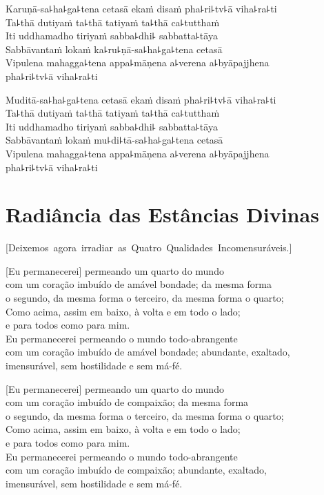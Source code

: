 Karuṇā-sa꜕ha꜕ga꜕tena cetasā ekaṁ disaṁ pha꜕ri꜕tv꜕ā viha꜕ra꜕ti\\
Ta꜕thā dutiyaṁ ta꜕thā tatiyaṁ ta꜕thā ca꜕tutthaṁ\\
Iti uddhamadho tiriyaṁ sabba꜕dhi꜕ sabbatta꜕tāya\\
Sabbāvantaṁ lokaṁ ka꜕ru꜕ṇā-sa꜕ha꜕ga꜕tena cetasā\\
Vipulena mahagga꜕tena appa꜕māṇena a꜕verena a꜕byāpajjhena\\
\vin pha꜕ri꜕tv꜕ā viha꜕ra꜕ti

Muditā-sa꜕ha꜕ga꜕tena cetasā ekaṁ disaṁ pha꜕ri꜕tv꜕ā viha꜕ra꜕ti\\
Ta꜕thā dutiyaṁ ta꜕thā tatiyaṁ ta꜕thā ca꜕tutthaṁ\\
Iti uddhamadho tiriyaṁ sabba꜕dhi꜕ sabbatta꜕tāya\\
Sabbāvantaṁ lokaṁ mu꜕di꜕tā-sa꜕ha꜕ga꜕tena cetasā\\
Vipulena mahagga꜕tena appa꜕māṇena a꜕verena a꜕byāpajjhena\\
\vin pha꜕ri꜕tv꜕ā viha꜕ra꜕ti

\chapter[Radiância das Estâncias Divinas]{Radiância das Estâncias Divinas}

\enlargethispage{\baselineskip}


\begin{leader}
  \vspace*{-\baselineskip}
  \mbox{[Deixemos agora irradiar as Quatro Qualidades Incomensuráveis.]}
\end{leader}

[Eu permanecerei] permeando um quarto do mundo\\
\vin com um coração imbuído de amável bondade; da mesma forma\\
\vin o segundo, da mesma forma o terceiro, da mesma forma o quarto;\\
Como acima, assim em baixo, à volta e em todo o lado;\\
\vin e para todos como para mim.\\
Eu permanecerei permeando o mundo todo-abrangente\\
\vin com um coração imbuído de amável bondade; abundante, exaltado,\\
\vin imensurável, sem hostilidade e sem má-fé.

[Eu permanecerei] permeando um quarto do mundo\\
\vin com um coração imbuído de compaixão; da mesma forma\\
\vin o segundo, da mesma forma o terceiro, da mesma forma o quarto;\\
Como acima, assim em baixo, à volta e em todo o lado;\\
\vin e para todos como para mim.\\
Eu permanecerei permeando o mundo todo-abrangente\\
\vin com um coração imbuído de compaixão; abundante, exaltado,\\
\vin imensurável, sem hostilidade e sem má-fé.


